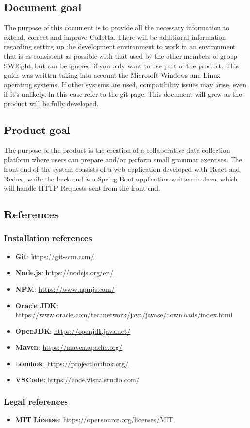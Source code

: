 \subsection{Document goal}
The purpose of this document is to provide all the necessary information to extend, correct and improve Colletta.
There will be additional information regarding setting up the development environment to work in an environment that is as consistent as possible with that used
by the other members of group SWEight, but can be ignored if you only want to use part of the product.
This guide was written taking into account the Microsoft Windows and Linux operating systems. If other systems are used, compatibility issues may arise, even if it’s unlikely. In this case refer to the git page. This document will grow as the product will be fully
developed.

\subsection{Product goal}
The purpose of the product is the creation of a collaborative data collection platform where users can prepare and/or perform small grammar exercises. 
The front-end of the system consists of a web application developed with React and Redux, while the back-end is a Spring Boot application written in Java, which will handle HTTP Requests sent from the front-end. 

\subsection{References}


\subsubsection{Installation references}

\begin{itemize}
\item \textbf{Git}: \url{https://git-scm.com/}
\item \textbf{Node.js}: \url{https://nodejs.org/en/}
\item \textbf{NPM}: \url{https://www.npmjs.com/}
\item \textbf{Oracle JDK}: \url{https://www.oracle.com/technetwork/java/javase/downloads/index.html}
\item \textbf{OpenJDK}: \url{https://openjdk.java.net/}
\item \textbf{Maven}: \url{https://maven.apache.org/}
\item \textbf{Lombok}: \url{https://projectlombok.org/}
\item \textbf{VSCode}: \url{https://code.visualstudio.com/} 

\end{itemize}

\subsubsection{Legal references}
\begin{itemize}
\item \textbf{MIT License}: \url{https://opensource.org/licenses/MIT}
\end{itemize}


